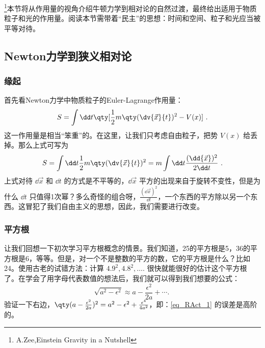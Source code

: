 \footnote{A.Zee,Einstein Gravity in a Nutshell}本节将从作用量的视角介绍牛顿力学到相对论的自然过渡，最终给出适用于物质粒子和光的作用量。阅读本节需带着“民主”的思想：时间和空间、粒子和光应当被平等对待。
\subsection{Newton力学到狭义相对论}
\subsubsection{缘起}
首先看Newton力学中物质粒子的Euler-Lagrange作用量：
\begin{equation}\label{eq_RAct_5}
S=\int\dd t\qty[\frac{1}{2}m\qty(\dv{\vec x}{t})^2-V(x)]~.
\end{equation}
这一作用量是相当“笨重”的。在这里，让我们只考虑自由粒子，把势 $V(x)$ 给丢掉。那么上式可写为
\begin{equation}\label{eq_RAct_2}
S=\int\dd t\frac{1}{2}m\qty(\dv{\vec x}{t})^2=m\int\dd t\frac{(\dd{\vec x})^2}{2\dd t}~.
\end{equation}
上式对待 $\dd{\vec x}$ 和 $\dd t$ 的方式是不平等的，$\dd{\vec x}$ 平方的出现来自于旋转不变性，但是为什么 $\dd t$ 只值得1次幂？多么奇怪的组合呀，$\frac{(\dd{\vec x})^2}{\dd t}$，一个东西的平方除以另一个东西。这冒犯了我们自由主义的思想，因此，我们需要进行改变。

\subsubsection{平方根}
让我们回想一下初次学习平方根概念的情景。我们知道，25的平方根是5，36的平方根是6，等等。但是，对一个不是整数的平方的数，它的平方根是什么？比如24。使用古老的试错方法：计算 $4.9^2,4.8^2,\ldots.$ 很快就能很好的估计这个平方根了。在学会了用字母代表数值的想法后，我们就可以得到我们想要的公式：
\begin{equation}\label{eq_RAct_1}
\sqrt{a^2-\epsilon^2}\approx a-\frac{\epsilon^2}{2a}+\cdots.~
\end{equation}
验证一下右边，$\qty(a-\frac{\epsilon^2}{2a})^2=a^2-\epsilon^2+\frac{\epsilon^4}{4a^2}$，即：\autoref{eq_RAct_1} 的误差是高阶的。


